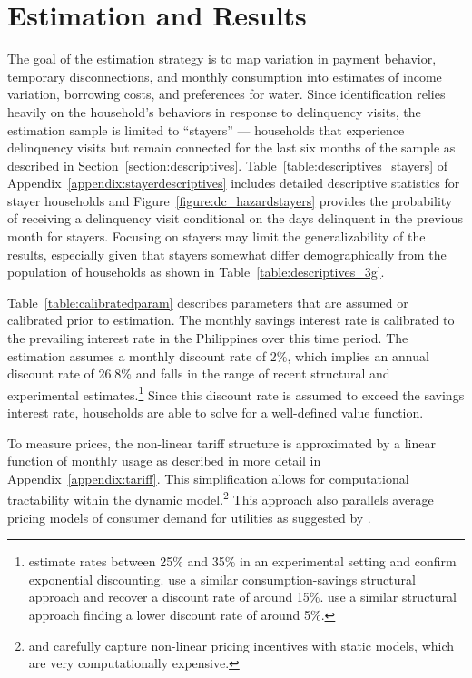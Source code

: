 \documentclass[12pt]{article}
\begin{document}
\section{Estimation and Results}\label{section:estimation}    %

The goal of the estimation strategy is to map variation in payment behavior, temporary disconnections, and monthly consumption into estimates of income variation, borrowing costs, and preferences for water.  Since identification relies heavily on the household's behaviors in response to delinquency visits, the estimation sample is limited to ``stayers'' --- households that experience delinquency visits but remain connected for the last six months of the sample as described in Section~\ref{section:descriptives}.  Table~\ref{table:descriptives_stayers} of Appendix~\ref{appendix:stayerdescriptives} includes detailed descriptive statistics for stayer households and Figure~\ref{figure:dc_hazardstayers} provides the probability of receiving a delinquency visit conditional on the days delinquent in the previous month for stayers.  Focusing on stayers may limit the generalizability of the results, especially given that stayers somewhat differ demographically from the population of households as shown in Table~\ref{table:descriptives_3g}.

Table~\ref{table:calibratedparam} describes parameters that are assumed or calibrated prior to estimation.  The monthly savings interest rate is calibrated to the prevailing interest rate in the Philippines over this time period.  The estimation assumes a monthly discount rate of 2\%, which implies an annual discount rate of 26.8\% and falls in the range of recent structural and experimental estimates.\footnote{\cite{andreoni2012estimating} estimate rates between 25\% and 35\% in an experimental setting and confirm exponential discounting.  \cite{laibson2007estimating} use a similar consumption-savings structural approach and recover a discount rate of around 15\%.  \cite{gourinchas2002consumption} use a similar structural approach finding a lower discount rate of around 5\%.}  Since this discount rate is assumed to exceed the savings interest rate, households are able to solve for a well-defined value function.

To measure prices, the non-linear tariff structure is approximated by a linear function of monthly usage as described in more detail in Appendix~\ref{appendix:tariff}.  This simplification allows for computational tractability within the dynamic model.\footnote{\cite{wjv} and \cite{szabo2015value} carefully capture non-linear pricing incentives with static models, which are very computationally expensive.}  This approach also parallels average pricing models of consumer demand for utilities as suggested by \cite{ito2014consumers}.  
\end{document}
